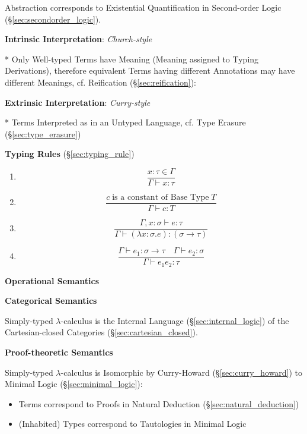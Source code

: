 Abstraction corresponds to Existential Quantification in Second-order
Logic (\S\ref{sec:secondorder_logic}).



\textbf{Intrinsic Interpretation}: \emph{Church-style}

* Only Well-typed Terms have Meaning (Meaning assigned to Typing
Derivations), therefore equivalent Terms having different Annotations
may have different Meanings, cf. Reification
(\S\ref{sec:reification}):



\textbf{Extrinsic Interpretation}: \emph{Curry-style}

* Terms Interpreted as in an Untyped Language, cf. Type Erasure
(\S\ref{sec:type_erasure})



\textbf{Typing Rules} (\S\ref{sec:typing_rule})

\begin{enumerate}
\item
  \[
    {
      \frac
      {x : \tau \in \Gamma}
      {\Gamma \vdash x : \tau}
    }
  \]
\item
  \[
    {
      \frac
      {c \;\text{is a constant of Base Type}\; T}
      {\Gamma \vdash c:T}
    }
  \]
\item
  \[
    {
      \frac
      {\Gamma, x:\sigma \vdash e:\tau}
      {\Gamma \vdash (\lambda x:\sigma.e):(\sigma \rightarrow \tau)}
    }
  \]
\item
  \[
    {
      \frac
      {\Gamma \vdash e_1:\sigma \rightarrow \tau \quad
        \Gamma \vdash e_2:\sigma}
      {\Gamma \vdash e_1 e_2 : \tau}
    }
  \]
\end{enumerate}



\textbf{Operational Semantics}

\textbf{Categorical Semantics}

Simply-typed $\lambda$-calculus is the Internal Language
(\S\ref{sec:internal_logic}) of the Cartesian-closed Categories
(\S\ref{sec:cartesian_closed}).



\textbf{Proof-theoretic Semantics}

Simply-typed $\lambda$-calculus is Isomorphic by Curry-Howard
(\S\ref{sec:curry_howard}) to Minimal Logic
(\S\ref{sec:minimal_logic}):
\begin{itemize}
  \item Terms correspond to Proofs in Natural Deduction
    (\S\ref{sec:natural_deduction})
  \item (Inhabited) Types correspond to Tautologies in Minimal Logic
\end{itemize}




